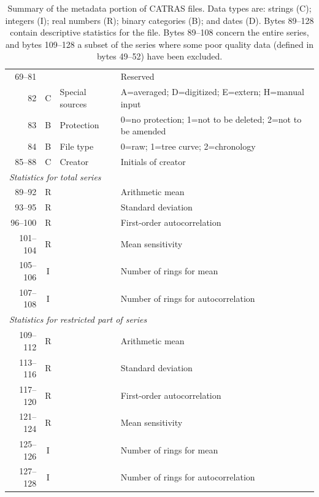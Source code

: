 \begin{table}[htbp]
\begin{center}
\begin{tabular*}{\textwidth}{r c l p{8cm} }
69--81 &  &  & Reserved \\
82       & C & Special sources & A=averaged; D=digitized; E=extern; H=manual input \\
83       & B & Protection & 0=no protection; 1=not to be deleted; 2=not to be amended \\
84       & B & File type & 0=raw; 1=tree curve; 2=chronology \\
85--88 & C & Creator & Initials of creator\\
\midrule
\multicolumn{4}{l}{\textit{Statistics for total series}} \\
89--92 & R & &Arithmetic mean  \\
93--95 & R & &Standard deviation  \\
96--100 & R & &First-order autocorrelation \\
101--104 & R & &Mean sensitivity  \\
105--106 & I & &Number of rings for mean  \\
107--108 & I & &Number of rings for autocorrelation  \\
\midrule
\multicolumn{4}{l}{\textit{Statistics for restricted part of series}} \\
109--112 & R & &Arithmetic mean  \\
113--116 & R & &Standard deviation  \\
117--120 & R & &First-order autocorrelation \\
121--124 & R & &Mean sensitivity  \\
125--126 & I & &Number of rings for mean  \\
127--128 & I & &Number of rings for autocorrelation  \\
\bottomrule
\end{tabular*}
\end{center}
\label{tbl:catrasMetadata}
\caption{Summary of the metadata portion of CATRAS files.  Data types are: strings (C); integers (I); real numbers (R); binary categories (B); and dates (D).  Bytes 89--128 contain descriptive statistics for the file.  Bytes 89--108 concern the entire series, and bytes 109--128 a subset of the series where some poor quality data (defined in bytes 49--52) have been excluded.}
\end{table}


